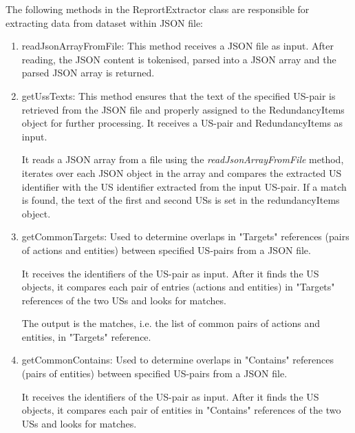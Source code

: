 The following methods in the ReprortExtractor class are responsible for extracting data from dataset within JSON file:
\begin{enumerate}
\item readJsonArrayFromFile: This method receives a JSON file as input. After reading, the JSON content is tokenised, parsed into a JSON array and the parsed JSON array is returned.

\item getUssTexts: This method ensures that the text of the specified US-pair is retrieved from the JSON file and properly assigned to the RedundancyItems object for further processing. It receives a US-pair and RedundancyItems as input. 

It reads a JSON array from a file using the \textit{readJsonArrayFromFile} method, iterates over each JSON object in the array and compares the extracted US identifier with the US identifier extracted from the input US-pair. If a match is found, the text of the first and second USs is set in the redundancyItems object.

\item getCommonTargets: Used to determine overlaps in "Targets" references (pairs of actions and entities) between specified US-pairs from a JSON file.

It receives the identifiers of the US-pair as input. After it finds the US objects, it compares each pair of entries (actions and entities) in "Targets" references of the two USs and looks for matches.

The output is the matches, i.e. the list of common pairs of actions and entities, in "Targets" reference.

\item getCommonContains: Used to determine overlaps in "Contains" references (pairs of entities) between specified US-pairs from a JSON file.

It receives the identifiers of the US-pair as input. After it finds the US objects, it compares each pair of entities in "Contains" references of the two USs and looks for matches.


\end{enumerate}
